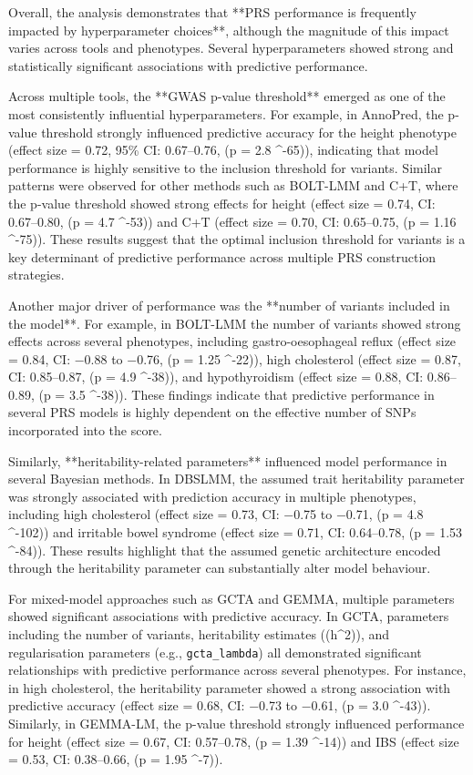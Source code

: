 \documentclass[pdflatex,sn-basic]{sn-jnl}
\begin{document}
Overall, the analysis demonstrates that **PRS performance is frequently impacted by hyperparameter choices**, although the magnitude of this impact varies across tools and phenotypes. Several hyperparameters showed strong and statistically significant associations with predictive performance.

Across multiple tools, the **GWAS p-value threshold** emerged as one of the most consistently influential hyperparameters. For example, in AnnoPred, the p-value threshold strongly influenced predictive accuracy for the height phenotype (effect size = 0.72, 95\% CI: 0.67–0.76, (p = 2.8 ^{-65})), indicating that model performance is highly sensitive to the inclusion threshold for variants. Similar patterns were observed for other methods such as BOLT-LMM and C+T, where the p-value threshold showed strong effects for height (effect size = 0.74, CI: 0.67–0.80, (p = 4.7 ^{-53})) and C+T (effect size = 0.70, CI: 0.65–0.75, (p = 1.16 ^{-75})). These results suggest that the optimal inclusion threshold for variants is a key determinant of predictive performance across multiple PRS construction strategies.

Another major driver of performance was the **number of variants included in the model**. For example, in BOLT-LMM the number of variants showed strong effects across several phenotypes, including gastro-oesophageal reflux (effect size = 0.84, CI: −0.88 to −0.76, (p = 1.25 ^{-22})), high cholesterol (effect size = 0.87, CI: 0.85–0.87, (p = 4.9 ^{-38})), and hypothyroidism (effect size = 0.88, CI: 0.86–0.89, (p = 3.5 ^{-38})). These findings indicate that predictive performance in several PRS models is highly dependent on the effective number of SNPs incorporated into the score.

Similarly, **heritability-related parameters** influenced model performance in several Bayesian methods. In DBSLMM, the assumed trait heritability parameter was strongly associated with prediction accuracy in multiple phenotypes, including high cholesterol (effect size = 0.73, CI: −0.75 to −0.71, (p = 4.8 ^{-102})) and irritable bowel syndrome (effect size = 0.71, CI: 0.64–0.78, (p = 1.53 ^{-84})). These results highlight that the assumed genetic architecture encoded through the heritability parameter can substantially alter model behaviour.

For mixed-model approaches such as GCTA and GEMMA, multiple parameters showed significant associations with predictive accuracy. In GCTA, parameters including the number of variants, heritability estimates ((h^2)), and regularisation parameters (e.g., \texttt{gcta_lambda}) all demonstrated significant relationships with predictive performance across several phenotypes. For instance, in high cholesterol, the heritability parameter showed a strong association with predictive accuracy (effect size = 0.68, CI: −0.73 to −0.61, (p = 3.0 ^{-43})). Similarly, in GEMMA-LM, the p-value threshold strongly influenced performance for height (effect size = 0.67, CI: 0.57–0.78, (p = 1.39 ^{-14})) and IBS (effect size = 0.53, CI: 0.38–0.66, (p = 1.95 ^{-7})).
\end{document}

